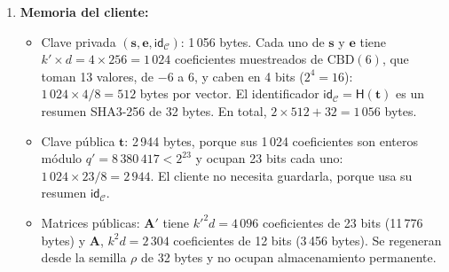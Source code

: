 \begin{enumerate}
    \item \textbf{Memoria del cliente:}
    \begin{itemize}
        \item Clave privada $(\mathbf{s}, \mathbf{e}, \mathsf{id}_{\mathcal{C}})$: 1\,056 bytes. Cada uno de $\mathbf{s}$ y $\mathbf{e}$ tiene $k' \times d = 4 \times 256 = 1\,024$ coeficientes muestreados de $\mathrm{CBD}(6)$, que toman 13 valores, de $-6$ a $6$, y caben en 4 bits ($2^4 = 16$): $1\,024 \times 4 / 8 = 512$ bytes por vector. El identificador $\mathsf{id}_{\mathcal{C}} = \mathsf{H}(\mathbf{t})$ es un resumen SHA3-256 de 32 bytes. En total, $2 \times 512 + 32 = 1\,056$ bytes.
        \item Clave pública $\mathbf{t}$: 2\,944 bytes, porque sus 1\,024 coeficientes son enteros módulo $q' = 8\,380\,417 < 2^{23}$ y ocupan 23 bits cada uno: $1\,024 \times 23 / 8 = 2\,944$. El cliente no necesita guardarla, porque usa su resumen $\mathsf{id}_{\mathcal{C}}$.
        \item Matrices públicas: $\mathbf{A}'$ tiene $k'^2 d = 4\,096$ coeficientes de 23 bits (11\,776 bytes) y $\mathbf{A}$, $k^2 d = 2\,304$ coeficientes de 12 bits (3\,456 bytes). Se regeneran desde la semilla $\rho$ de 32 bytes y no ocupan almacenamiento permanente.
    \end{itemize}


\end{enumerate}
